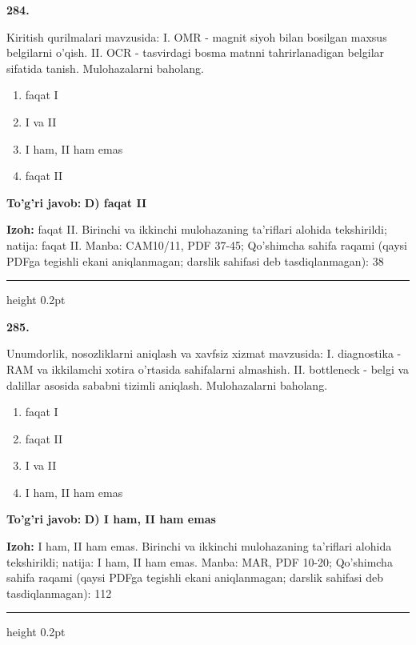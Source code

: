 \documentclass[10pt,a4paper]{article}
\begin{document}
{\bfseries\sffamily\color{ink} 284.}
\par
Kiritish qurilmalari mavzusida: I. OMR - magnit siyoh bilan bosilgan maxsus belgilarni o'qish. II. OCR - tasvirdagi bosma matnni tahrirlanadigan belgilar sifatida tanish. Mulohazalarni baholang.
\begin{enumerate}[label=\Alph*),leftmargin=9mm]
\item faqat I
\item I va II
\item I ham, II ham emas
\item faqat II
\end{enumerate}
\begin{tcolorbox}[enhanced,breakable,colback=teal!4,colframe=teal!60!black,boxrule=0.45pt,arc=1.2mm,left=2.7mm,right=2.7mm,top=1.8mm,bottom=1.8mm,before skip=2mm,after skip=2mm]
{\bfseries\sffamily\color{teal}To'g'ri javob:} \textbf{D) faqat II}
\par\smallskip
{\bfseries Izoh:} faqat II. Birinchi va ikkinchi mulohazaning ta'riflari alohida tekshirildi; natija: faqat II. Manba: CAM10/11, PDF 37-45; Qo'shimcha sahifa raqami (qaysi PDFga tegishli ekani aniqlanmagan; darslik sahifasi deb tasdiqlanmagan): 38
\end{tcolorbox}
\vspace{2mm}\hrule height 0.2pt\vspace{3mm}

{\bfseries\sffamily\color{ink} 285.}
\par
Unumdorlik, nosozliklarni aniqlash va xavfsiz xizmat mavzusida: I. diagnostika - RAM va ikkilamchi xotira o'rtasida sahifalarni almashish. II. bottleneck - belgi va dalillar asosida sababni tizimli aniqlash. Mulohazalarni baholang.
\begin{enumerate}[label=\Alph*),leftmargin=9mm]
\item faqat I
\item faqat II
\item I va II
\item I ham, II ham emas
\end{enumerate}
\begin{tcolorbox}[enhanced,breakable,colback=teal!4,colframe=teal!60!black,boxrule=0.45pt,arc=1.2mm,left=2.7mm,right=2.7mm,top=1.8mm,bottom=1.8mm,before skip=2mm,after skip=2mm]
{\bfseries\sffamily\color{teal}To'g'ri javob:} \textbf{D) I ham, II ham emas}
\par\smallskip
{\bfseries Izoh:} I ham, II ham emas. Birinchi va ikkinchi mulohazaning ta'riflari alohida tekshirildi; natija: I ham, II ham emas. Manba: MAR, PDF 10-20; Qo'shimcha sahifa raqami (qaysi PDFga tegishli ekani aniqlanmagan; darslik sahifasi deb tasdiqlanmagan): 112
\end{tcolorbox}
\vspace{2mm}\hrule height 0.2pt\vspace{3mm}
\end{document}
